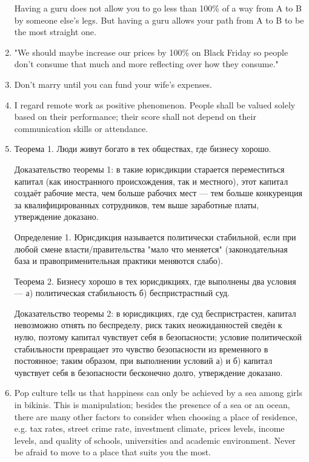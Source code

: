 \documentclass[11pt]{article}
\theoremstyle{remark}
\theoremstyle{definition}
\begin{document}
\begin{enumerate}
Having a guru does not allow you to go less than 100\% of a way from A to B by someone else's legs. But having a guru allows your path from A to B to be the most straight one.



\item "We should maybe increase our prices by 100\% on Black Friday so people don't consume that much and more reflecting over how they consume."


\item Don't marry until you can fund your wife's expenses.


\item I regard remote work as positive phenomenon. People shall be valued solely based on their performance; their score shall not depend on their communication skills or attendance.


\item Теорема 1. Люди живут богато в тех обществах, где бизнесу хорошо.

Доказательство теоремы 1: в такие юрисдикции старается переместиться капитал (как иностранного происхождения, так и местного), этот капитал создаёт рабочие места, чем больше рабочих мест — тем больше конкуренция за квалифицированных сотрудников, тем выше заработные платы, утверждение доказано.

Определение 1. Юрисдикция называется политически стабильной, если при любой смене власти/правительства "мало что меняется" (законодательная база и правоприменительная практики меняются слабо). 

Теорема 2. Бизнесу хорошо в тех юрисдикциях, где выполнены два условия — а) политическая стабильность б) беспристрастный суд.

Доказательство теоремы 2: в юрисдикциях, где суд беспристрастен, капитал невозможно отнять по беспределу, риск таких неожиданностей сведён к нулю, поэтому капитал чувствует себя в безопасности; условие политической стабильности превращает это чувство безопасности из временного в постоянное; таким образом, при выполнении условий а) и б) капитал чувствует себя в безопасности бесконечно долго, утверждение доказано.


\item Pop culture tells us that happiness can only be achieved by a sea among girls in bikinis. This is manipulation; besides the presence of a sea or an ocean, there are many other factors to consider when choosing a place of residence, e.g. tax rates, street crime rate, investment climate, prices levels, income levels, and quality of schools, universities and academic environment. Never be afraid to move to a place that suits you the most.



\end{enumerate}
\end{document}
